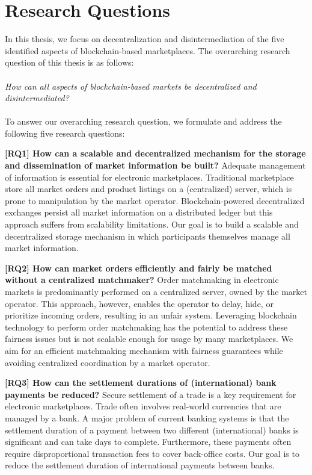 \section{Research Questions}
\label{sec:research_questions}
In this thesis, we focus on decentralization and disintermediation of the five identified aspects of blockchain-based marketplaces.
The overarching research question of this thesis is as follows:\\\\
\emph{How can all aspects of blockchain-based markets be decentralized and disintermediated?}\\\\
To answer our overarching research question, we formulate and address the following five research questions:

\textbf{[RQ1] How can a scalable and decentralized mechanism for the storage and dissemination of market information be built?}
Adequate management of information is essential for electronic marketplaces.
Traditional marketplace store all market orders and product listings on a (centralized) server, which is prone to manipulation by the market operator.
Blockchain-powered decentralized exchanges persist all market information on a distributed ledger but this approach suffers from scalability limitations.
Our goal is to build a scalable and decentralized storage mechanism in which participants themselves manage all market information.

\textbf{[RQ2] How can market orders efficiently and fairly be matched without a centralized matchmaker?}
Order matchmaking in electronic markets is predominantly performed on a centralized server, owned by the market operator.
This approach, however, enables the operator to delay, hide, or prioritize incoming orders, resulting in an unfair system.
Leveraging blockchain technology to perform order matchmaking has the potential to address these fairness issues but is not scalable enough for usage by many marketplaces.
We aim for an efficient matchmaking mechanism with fairness guarantees while avoiding centralized coordination by a market operator.

\textbf{[RQ3] How can the settlement durations of (international) bank payments be reduced?}
Secure settlement of a trade is a key requirement for electronic marketplaces.
Trade often involves real-world currencies that are managed by a bank.
A major problem of current banking systems is that the settlement duration of a payment between two different (international) banks is significant and can take days to complete.
Furthermore, these payments often require disproportional transaction fees to cover back-office costs.
Our goal is to reduce the settlement duration of international payments between banks.

